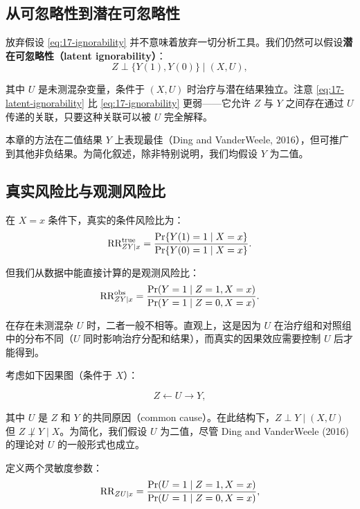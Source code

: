\subsection{从可忽略性到潜在可忽略性}\label{sec:17-latent-ignorability}

放弃假设 \cref{eq:17-ignorability} 并不意味着放弃一切分析工具。我们仍然可以假设\textbf{潜在可忽略性（latent ignorability）}：
\begin{equation}
Z \perp \{Y(1), Y(0)\} \mid (X, U) ,
\label{eq:17-latent-ignorability}
\end{equation}

其中 $U$ 是未测混杂变量，条件于 $(X,U)$ 时治疗与潜在结果独立。注意 \cref{eq:17-latent-ignorability} 比 \cref{eq:17-ignorability} 更弱——它允许 $Z$ 与 $Y$ 之间存在通过 $U$ 传递的关联，只要这种关联可以被 $U$ 完全解释。

本章的方法在二值结果 $Y$ 上表现最佳（Ding and VanderWeele, 2016），但可推广到其他非负结果。为简化叙述，除非特别说明，我们均假设 $Y$ 为二值。

\subsection{真实风险比与观测风险比}\label{sec:17-true-vs-observed-rr}

在 $X=x$ 条件下，真实的条件风险比为：
\begin{equation}
\text{RR}_{ZY\mid x}^{\mathrm{true}} = \frac{\operatorname{Pr}\{Y(1)=1 \mid X=x\}}{\operatorname{Pr}\{Y(0)=1 \mid X=x\}} .
\label{eq:17-true-rr}
\end{equation}

但我们从数据中能直接计算的是观测风险比：
\begin{equation}
\text{RR}_{ZY\mid x}^{\mathrm{obs}} = \frac{\operatorname{Pr}(Y=1 \mid Z=1, X=x)}{\operatorname{Pr}(Y=1 \mid Z=0, X=x)} .
\label{eq:17-obs-rr}
\end{equation}

在存在未测混杂 $U$ 时，二者一般不相等。直观上，这是因为 $U$ 在治疗组和对照组中的分布不同（$U$ 同时影响治疗分配和结果），而真实的因果效应需要控制 $U$ 后才能得到。

考虑如下因果图（条件于 $X$）：

\[
Z \leftarrow U \rightarrow Y ,
\]

其中 $U$ 是 $Z$ 和 $Y$ 的共同原因（common cause）。在此结构下，$Z \perp Y \mid (X,U)$ 但 $Z \not\perp Y \mid X$。为简化，我们假设 $U$ 为二值，尽管 Ding and VanderWeele (2016) 的理论对 $U$ 的一般形式也成立。

定义两个灵敏度参数：
\begin{equation}
\text{RR}_{ZU\mid x} = \frac{\operatorname{Pr}(U=1 \mid Z=1, X=x)}{\operatorname{Pr}(U=1 \mid Z=0, X=x)} ,
\label{eq:17-sensitivity-zu}
\end{equation}

